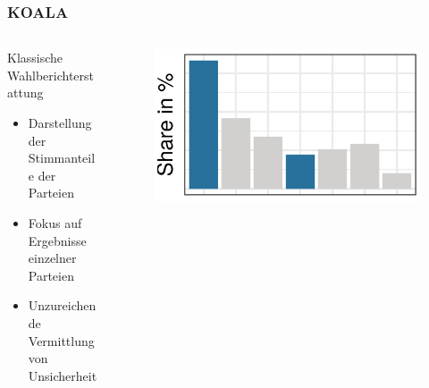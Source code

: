 \documentclass[aspectratio=169,xcolor=dvipsnames]{beamer}
\begin{document}
\begin{frame}
\frametitle{KOALA}
\begin{columns}
\begin{column}{0.6\textwidth}
Klassische Wahlberichterstattung
\begin{itemize}
\item Darstellung der Stimmanteile der Parteien
\item Fokus auf Ergebnisse einzelner Parteien
\item Unzureichende Vermittlung von Unsicherheit			
\end{itemize}
\end{column}
\begin{column}{0.4\textwidth}
\begin{figure}
\includegraphics[width=\textwidth]{partyshare}
\end{figure}
\end{column}
\end{columns}
\end{frame}
\end{document}
